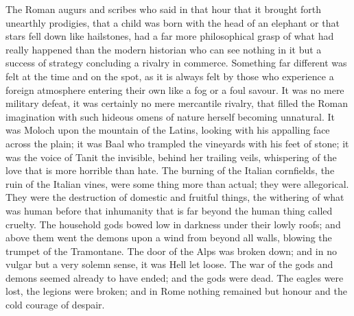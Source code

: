 The Roman augurs and scribes who said in that hour that it brought forth unearthly prodigies, that a child was born with the head of an elephant or that stars fell down like hailstones, had a far more philosophical grasp of what had really happened than the modern historian who can see nothing in it but a success of strategy concluding a rivalry in commerce. Something far different was felt at the time and on the spot, as it is always felt by those who experience a foreign atmosphere entering their own like a fog or a foul savour. It was no mere military defeat, it was certainly no mere mercantile rivalry, that filled the Roman imagination with such hideous omens of nature herself becoming unnatural. It was Moloch upon the mountain of the Latins, looking with his appalling face across the plain; it was Baal who trampled the vineyards with his feet of stone; it was the voice of Tanit the invisible, behind her trailing veils, whispering of the love that is more horrible than hate. The burning of the Italian cornfields, the ruin of the Italian vines, were some thing more than actual; they were allegorical. They were the destruction of domestic and fruitful things, the withering of what was human before that inhumanity that is far beyond the human thing called cruelty. The household gods bowed low in darkness under their lowly roofs; and above them went the demons upon a wind from beyond all walls, blowing the trumpet of the Tramontane. The door of the Alps was broken down; and in no vulgar but a very solemn sense, it was Hell let loose. The war of the gods and demons seemed already to have ended; and the gods were dead. The eagles were lost, the legions were broken; and in Rome nothing remained but honour and the cold courage of despair.

